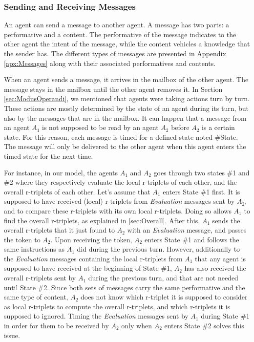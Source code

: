 \subsubsection{Sending and Receiving Messages}
\label{sec:funMessages}

An agent can send a message to another agent. A message has two parts: a performative and a content.
The performative of the message indicates to the other agent the intent of the message, while the content vehicles a knowledge that the sender has.
The different types of messages are presented in Appendix \ref{apx:Messages} along with their associated performatives and contents.

When an agent sends a message, it arrives in the mailbox of the other agent. The message stays in the mailbox until the other agent removes it. In Section \ref{sec:ModusOperandi}, we mentioned that agents were taking actions turn by turn. These actions are mostly determined by the state of an agent during its turn, but also by the messages that are in the mailbox. It can happen that a message from an agent $A_{1}$ is not supposed to be read by an agent $A_{2}$ before $A_{2}$ is a certain state. For this reason, each message is timed for a defined state noted \#State. The message will only be delivered to the other agent when this agent enters the timed state for the next time.

For instance, in our model, the agents $A_{1}$ and $A_{2}$ goes through two states \#1 and \#2 where they respectively evaluate the local r-triplets of each other, and the overall r-triplets of each other. Let's assume that $A_{1}$ enters State \#1 first. It is supposed to have received (local) r-triplets from \emph{Evaluation} messages sent by $A_{2}$, and to compare these r-triplets with its own local r-triplets. Doing so allows $A_{1}$ to find the overall r-triplets, as explained in \ref{sec:Overall}. After this, $A_{1}$ sends the overall r-triplets that it just found to $A_{2}$ with an \emph{Evaluation} message, and passes the token to $A_{2}$. Upon receiving the token, $A_{2}$ enters State \#1 and follows the same instructions as $A_{1}$ did during the previous turn. However, additionally to the \emph{Evaluation} messages containing the local r-triplets from $A_{1}$ that any agent is supposed to have received at the beginning of State \#1, $A_{2}$ has also received the overall r-triplets sent by $A_{1}$ during the previous turn, and that are not needed until State \#2. Since both sets of messages carry the same performative and the same type of content, $A_{2}$ does not know which r-triplet it is supposed to consider as local r-triplets to compute the overall r-triplets, and which r-triplets it is supposed to ignored. Timing the \emph{Evaluation} messages sent by $A_{1}$ during State \#1 in order for them to be received by $A_{2}$ only when $A_{2}$ enters State \#2 solves this issue.

